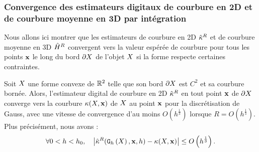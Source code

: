 \subsubsection{Convergence des estimateurs digitaux de courbure en 2D et de courbure moyenne en 3D par intégration}
%
Nous allons ici montrer que les estimateurs de courbure en 2D $\hat{\kappa}^{R}$ et de
courbure moyenne en 3D $\hat{H}^{R}$ convergent vers la valeur espérée de
courbure pour tous les points $\mathbf{x}$ le long du bord $\partial X$ de l'objet $X$ si
la forme respecte certaines contraintes.
%
\begin{theorem}{}
  \label{thm:convergence-curv-2d}
  Soit $X$ une forme convexe de $\mathbb{R}^2$ telle que son bord $\partial X$ est $C^2$ et
  sa courbure bornée. Alors, l'estimateur digital de courbure en 2D $\hat{\kappa}^{R}$ en
  tout point $\mathbf{x}$ de $\partial X$ converge vers la courbure
  $\kappa(X,\mathbf{x})$ de $X$ au point $\mathbf{x}$ pour la discrétisation de
  Gauss, avec une vitesse de convergence d'au moins $O(h^{\frac{1}{3}})$ lorsque
  $R = O(h^{\frac{1}{3}})$. Plus précisément, nous avons :
  \begin{equation}
    \forall 0 < h < h_0,
    \quad \left | \CurvH{R}(\DSh, \vx, h) - \Curv(\Shape, \vx) \right|
                          \le O \left(h^{\frac{1}{3}}\right). %
  \end{equation}
\end{theorem}
